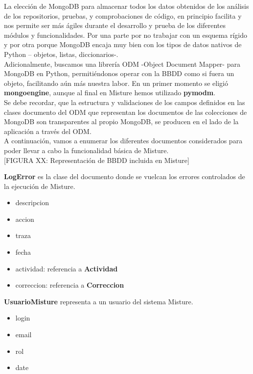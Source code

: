 La elección de MongoDB para almacenar todos los datos obtenidos de los análisis de los repositorios, pruebas, y comprobaciones de código, en principio facilita y nos permite ser más ágiles durante el desarrollo y prueba de los diferentes módulos y funcionalidades. Por una parte por no trabajar con un esquema rígido y por otra porque MongoDB encaja muy bien con los tipos de datos nativos de Python – objetos, listas, diccionarios-.\\


Adicionalmente, buscamos una librería ODM -Object Document Mapper- para MongoDB en Python, permitiéndonos operar con la BBDD como si fuera un objeto, facilitando aún más nuestra labor. En un primer momento se eligió \textbf{mongoengine}, aunque al final en Misture hemos utilizado \textbf{pymodm}.\\


Se debe recordar, que la estructura y validaciones de los campos definidos en las clases documento del ODM que representan los documentos de las colecciones de MongoDB son transparentes al propio MongoDB, se producen en el lado de la aplicación a través del ODM.\\


A continuación, vamos a enumerar los diferentes documentos considerados para poder llevar a cabo la funcionalidad básica de Misture.\\


[FIGURA XX: Representación de BBDD incluida en Misture]


\textbf{LogError} es la clase del documento donde se vuelcan los errores controlados de la ejecución de Misture.
\begin{itemize}
\item descripcion
\item accion
\item traza
\item fecha
\item actividad: referencia a \textbf{Actividad}
\item correccion: referencia a \textbf{Correccion}
\end{itemize}


\textbf{UsuarioMisture} representa a un usuario del sistema Misture.
\begin{itemize}
\item login
\item email
\item rol
\item date
\end{itemize}


